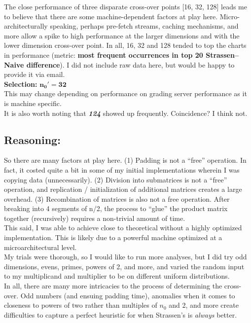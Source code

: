\documentclass[conference]{styles/acmsiggraph}
\newcommand{\?}{\stackrel{?}{=}}
\begin{document}
The close performance of three disparate cross-over points [16, 32, 128] leads me to believe that there are some machine-dependent factors at play here.  Micro-architecturally speaking, perhaps pre-fetch streams, caching mechanisms, and more allow a spike to high performance at the larger dimensions and with the lower dimension cross-over point.  In all, 16, 32 and 128 tended to top the charts in performance (metric: \textbf{most frequent occurrences in top 20 Strassen--Naive difference}).  I did not include raw data here, but would be happy to provide it via email. \\

\textbf{Selection:} $\mathbf{n_0' = 32}$\\
This may change depending on performance on grading server performance as it is machine specific.\\
It is also worth noting that \textbf{\textit{124}} showed up frequently.  Coincidence?  I think not.

\subsection{Reasoning:}
So there are many factors at play here.  (1) Padding is not a \enquote{free} operation.  In fact, it costed quite a bit in some of my initial implementations wherein I was copying data (unnecessarily).  (2) Division into submatrices is not a \enquote{free} operation, and replication / initialization of additional matrices creates a large overhead.  (3) Recombination of matrices is also not a free operation.  After breaking into 4 segments of n/2, the process to \enquote{glue} the product matrix together (recursively) requires a non-trivial amount of time.\\

This said, I was able to achieve close to theoretical without a highly optimized implementation.  This is likely due to a powerful machine optimized at a microarchitectural level.\\

My trials were thorough, so I would like to run more analyses, but I did try odd dimensions, evens, primes, powers of 2, and more, and varied the random input to my multiplicand and multiplier to be on different uniform distributions.\\

In all, there are many more intricacies to the process of determining the cross-over.  Odd numbers (and ensuing padding time), anomalies when it comes to closeness to powers of two rather than multiples of $n_0$ and 2, and more create difficulties to capture a perfect heuristic for when Strassen's is \textit{always} better.
\end{document}
